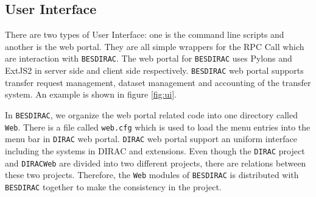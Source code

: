 \subsection{User Interface}
There are two types of User Interface: one is the command line scripts and 
another is the web portal. 
They are all simple wrappers for the RPC Call which are interaction
with {\tt BESDIRAC}.
The web portal for {\tt BESDIRAC} uses Pylons and ExtJS2 in server side and
client side respectively\cite{bib:webportal}. {\tt BESDIRAC} web portal supports
transfer request management, dataset management and  
accounting of the transfer system. An example is shown in figure
\ref{fig:ui}.

In {\tt BESDIRAC}, we organize the web portal related code into one
directory called {\tt Web}. There is a file called \verb"web.cfg"
which is used to load the menu entries into the menu bar in {\tt DIRAC} 
web portal. {\tt DIRAC} web portal support an uniform interface including
the systems in DIRAC and extensions.
Even though the {\tt DIRAC} project and {\tt DIRACWeb} are divided into
two different projects, there are relations between these two projects. 
Therefore, the {\tt Web} modules of {\tt BESDIRAC} is distributed 
with {\tt BESDIRAC} together to make the consistency in the project. 

